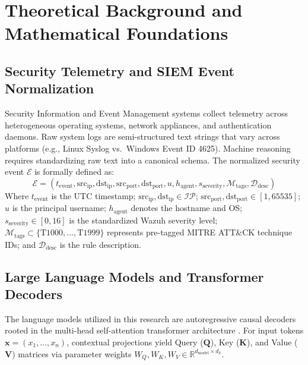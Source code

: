 \chapter{Theoretical Background and Mathematical Foundations}
\label{ch:theory}

\section{Security Telemetry and SIEM Event Normalization}
\label{sec:theory_telemetry}
Security Information and Event Management systems collect telemetry across heterogeneous operating systems, network appliances, and authentication daemons. Raw system logs are semi-structured text strings that vary across platforms (e.g., Linux Syslog vs.\ Windows Event ID 4625). Machine reasoning requires standardizing raw text into a canonical schema. The normalized security event $\mathcal{E}$ is formally defined as:
\begin{equation}
\label{eq:alert_tuple}
\mathcal{E} = \left( t_{\text{event}}, \text{src}_{\text{ip}}, \text{dst}_{\text{ip}}, \text{src}_{\text{port}}, \text{dst}_{\text{port}}, u, h_{\text{agent}}, s_{\text{severity}}, \mathcal{M}_{\text{tags}}, \mathcal{D}_{\text{desc}} \right)
\end{equation}
Where $t_{\text{event}}$ is the UTC timestamp; $\text{src}_{\text{ip}}, \text{dst}_{\text{ip}} \in \mathcal{IP}$; $\text{src}_{\text{port}}, \text{dst}_{\text{port}} \in [1, 65535]$; $u$ is the principal username; $h_{\text{agent}}$ denotes the hostname and OS; $s_{\text{severity}} \in [0, 16]$ is the standardized Wazuh severity level; $\mathcal{M}_{\text{tags}} \subset \{\text{T1000}, \dots, \text{T1999}\}$ represents pre-tagged MITRE ATT\&CK technique IDs; and $\mathcal{D}_{\text{desc}}$ is the rule description.

\section{Large Language Models and Transformer Decoders}
\label{sec:theory_llm}
The language models utilized in this research are autoregressive causal decoders rooted in the multi-head self-attention transformer architecture \cite{vaswani2017attention}. For input tokens $\mathbf{x} = (x_1, \dots, x_n)$, contextual projections yield Query ($\mathbf{Q}$), Key ($\mathbf{K}$), and Value ($\mathbf{V}$) matrices via parameter weights $W_Q, W_K, W_V \in \mathbb{R}^{d_{\text{model}} \times d_k}$.

